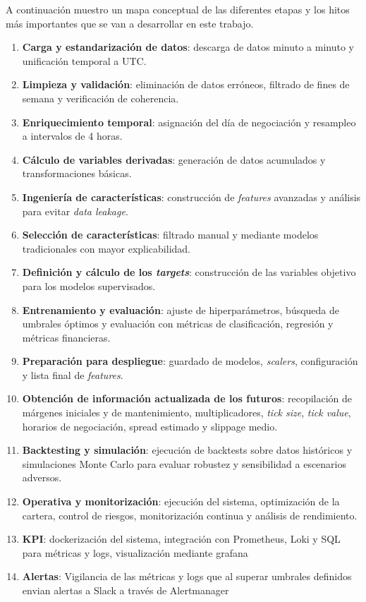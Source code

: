 A continuación muestro un mapa conceptual de las diferentes etapas y los hitos más importantes que se van a desarrollar en este trabajo.

\begin{enumerate}
    \item \textbf{Carga y estandarización de datos}: descarga de datos minuto a minuto y unificación temporal a UTC.
    \item \textbf{Limpieza y validación}: eliminación de datos erróneos, filtrado de fines de semana y verificación de coherencia.
    \item \textbf{Enriquecimiento temporal}: asignación del día de negociación y resampleo a intervalos de 4 horas.
    \item \textbf{Cálculo de variables derivadas}: generación de datos acumulados y transformaciones básicas.
    \item \textbf{Ingeniería de características}: construcción de \textit{features} avanzadas y análisis para evitar \textit{data leakage}.
    \item \textbf{Selección de características}: filtrado manual y mediante modelos tradicionales con mayor explicabilidad.
    \item \textbf{Definición y cálculo de los \textit{targets}}: construcción de las variables objetivo para los modelos supervisados.
    \item \textbf{Entrenamiento y evaluación}: ajuste de hiperparámetros, búsqueda de umbrales óptimos y evaluación con métricas de clasificación, regresión y métricas financieras.
    \item \textbf{Preparación para despliegue}: guardado de modelos, \textit{scalers}, configuración y lista final de \textit{features}.
    \item \textbf{Obtención de información actualizada de los futuros}: recopilación de márgenes iniciales y de mantenimiento, multiplicadores, 
    \textit{tick size}, \textit{tick value}, horarios de negociación, spread estimado y slippage medio.
    \item \textbf{Backtesting y simulación}: ejecución de backtests sobre datos históricos y simulaciones Monte Carlo para evaluar robustez y 
    sensibilidad a escenarios adversos.
    \item \textbf{Operativa y monitorización}: ejecución del sistema, optimización de la cartera, control de riesgos, monitorización continua y análisis de rendimiento.
    \item \textbf{KPI}: dockerización del sistema, integración con Prometheus, Loki y SQL para métricas y logs, visualización mediante grafana
    \item \textbf{Alertas}: Vigilancia de las métricas y logs que al superar umbrales definidos envian alertas a Slack a través de Alertmanager
\end{enumerate}

